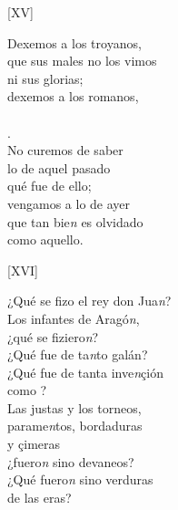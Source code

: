 \documentclass[11pt,a4paper,twoside]{article}
\begin{document}
{\begin{center}
	[XV]
\end{center}
\pstart
Dexemos a los troyanos,\\
que sus males no los vimos\\
ni sus glorias;\\
dexemos a los romanos,\\
\\
.\\
No curemos de saber\\
lo de aquel  pasado\\
qué fue de ello;\\
vengamos a lo de ayer\\
que tan bie\textit{n} es olvidado\\
como aquello.
\pend

\begin{center}
	[XVI]
\end{center}
\pstart
¿Qué se fizo el rey don Jua\textit{n}?\\
Los infantes de Aragó\textit{n},\\
¿qué se fiziero\textit{n}?\\
¿Qué fue de ta\textit{n}to galán?\\
¿Qué fue de tanta inve\textit{n}çión\\
como ?\\
Las justas y los torneos,\\
parame\textit{n}tos, bordaduras\\
y çimeras\\
¿fuero\textit{n} sino devaneos?\\
¿Qué fuero\textit{n} sino verduras\\
de las eras?
\pend

}
\end{document}
